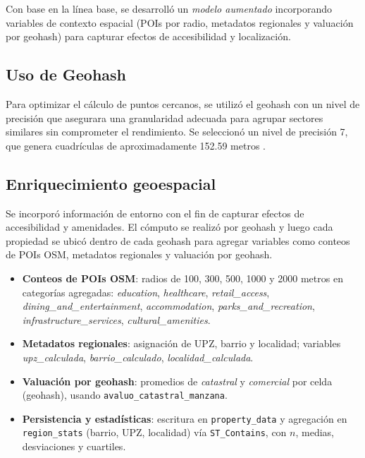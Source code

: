 Con base en la línea base, se desarrolló un \emph{modelo aumentado} incorporando variables de contexto espacial (POIs por radio, metadatos regionales y valuación por geohash) para capturar efectos de accesibilidad y localización.

\subsection*{Uso de Geohash}
Para optimizar el cálculo de puntos cercanos, se utilizó el geohash con un nivel de precisión que 
asegurara una granularidad adecuada para agrupar sectores similares sin comprometer el rendimiento. 
Se seleccionó un nivel de precisión 7, que genera cuadrículas de aproximadamente 
152.59 metros \cite{geohash_size}.

\subsection*{Enriquecimiento geoespacial}
Se incorporó información de entorno con el fin de capturar efectos de accesibilidad y amenidades. 
El cómputo se realizó por geohash y luego cada propiedad se ubicó dentro de cada geohash para 
agregar variables como conteos de POIs OSM, metadatos regionales y valuación por geohash.
\begin{itemize}
    \item \textbf{Conteos de POIs OSM}: radios de 100, 300, 500, 1000 y 2000 metros en categorías agregadas: \emph{education}, \emph{healthcare}, \emph{retail\_access}, \emph{dining\_and\_entertainment}, \emph{accommodation}, \emph{parks\_and\_recreation}, \emph{infrastructure\_services}, \emph{cultural\_amenities}.
    \item \textbf{Metadatos regionales}: asignación de UPZ, barrio y localidad; variables \emph{upz\_calculada}, \emph{barrio\_calculado}, \emph{localidad\_calculada}.
    \item \textbf{Valuación por geohash}: promedios de \emph{catastral} y \emph{comercial} por celda (geohash), usando \texttt{avaluo\_catastral\_manzana}.
    \item \textbf{Persistencia y estadísticas}: escritura en \texttt{property\_data} y agregación en \texttt{region\_stats} (barrio, UPZ, localidad) vía \texttt{ST\_Contains}, con \(n\), medias, desviaciones y cuartiles.
\end{itemize}


